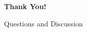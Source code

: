 \begin{frame}[plain]
  \centering
  \vfill
  {\color{TitleColor}\fontsize{36}{43}\selectfont\bfseries Thank You!\par}
  \vspace{0.4cm}
  {\color{ResearchColor}\fontsize{18}{22}\selectfont Questions and Discussion\par}
  \vfill
\end{frame}
